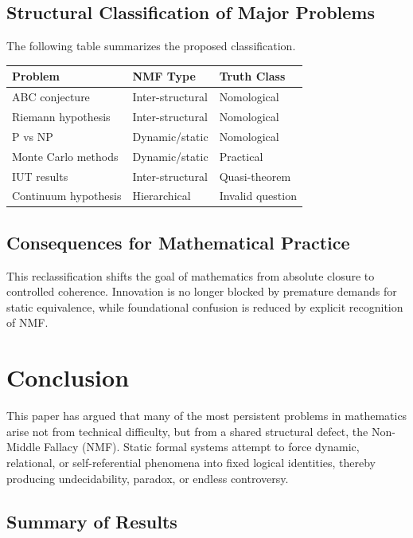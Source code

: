 \documentclass[11pt]{article}
\begin{document}
\subsection{Structural Classification of Major Problems}

The following table summarizes the proposed classification.

\begin{center}
\begin{tabular}{|l|l|l|}
\hline
Problem & NMF Type & Truth Class \\
\hline
ABC conjecture & Inter-structural & Nomological \\
Riemann hypothesis & Inter-structural & Nomological \\
P vs NP & Dynamic/static & Nomological \\
Monte Carlo methods & Dynamic/static & Practical \\
IUT results & Inter-structural & Quasi-theorem \\
Continuum hypothesis & Hierarchical & Invalid question \\
\hline
\end{tabular}
\end{center}

\subsection{Consequences for Mathematical Practice}

This reclassification shifts the goal of mathematics from absolute
closure to controlled coherence.
Innovation is no longer blocked by premature demands for static
equivalence, while foundational confusion is reduced by explicit
recognition of NMF.

\section{Conclusion}

This paper has argued that many of the most persistent problems in
mathematics arise not from technical difficulty, but from a shared
structural defect, the Non-Middle Fallacy (NMF).
Static formal systems attempt to force dynamic, relational, or
self-referential phenomena into fixed logical identities, thereby
producing undecidability, paradox, or endless controversy.

\subsection{Summary of Results}
\end{document}
